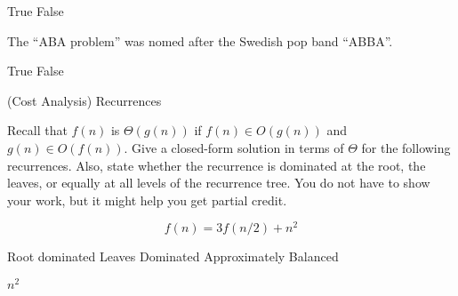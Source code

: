 \begin{cluster}
\begin{parts}
\begin{problem}[2]
\begin{pickone}
\correctchoice True
\choice False
\end{pickone}
\end{problem}



\begin{problem}[2]

The ``ABA problem'' was nomed after the Swedish pop band ``ABBA''.

\begin{pickone}
\choice True
\correctchoice False
\end{pickone}

\end{problem}

\end{parts}
\end{cluster}

\begin{cluster}{(Cost Analysis) Recurrences}

\begin{gram}
Recall that $f(n)$ is $\Theta(g(n))$
if $f(n) \in O(g(n))$ and $g(n) \in O(f(n))$.
Give a closed-form
solution in terms of $\Theta$ for the following recurrences.
Also, state whether the recurrence is dominated at the root, the
leaves, or equally at all levels of the recurrence tree.
You do not have to show your work, but it might help you get partial
credit.
\end{gram}

\begin{parts}

\begin{problem}[2]
\[
f(n) = 3 f(n/2) + n^2
\]

\begin{pickone}
\correctchoice Root dominated
\choice Leaves Dominated
\choice Approximately Balanced
\end{pickone}
\end{problem}
\begin{solution}
$n^2$
\end{solution}

\end{parts}
\end{cluster}
